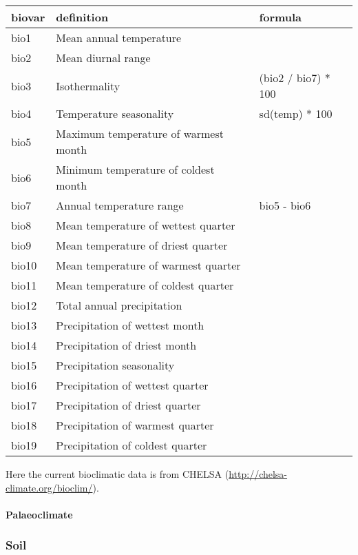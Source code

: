 \documentclass[]{article}
\let\oldparagraph\paragraph
\renewcommand{\paragraph}[1]{\oldparagraph{#1}\mbox{}}
\begin{document}
\captionsetup[table]{labelformat=empty,skip=1pt}
\begin{longtable}{lll}
\toprule
biovar & definition & formula \\ 
\midrule
bio1 & Mean annual temperature &  \\ 
bio2 & Mean diurnal range &  \\ 
bio3 & Isothermality & (bio2 / bio7) * 100 \\ 
bio4 & Temperature seasonality & sd(temp) * 100 \\ 
bio5 & Maximum temperature of warmest month &  \\ 
bio6 & Minimum temperature of coldest month &  \\ 
bio7 & Annual temperature range & bio5 - bio6 \\ 
bio8 & Mean temperature of wettest quarter &  \\ 
bio9 & Mean temperature of driest quarter &  \\ 
bio10 & Mean temperature of warmest quarter &  \\ 
bio11 & Mean temperature of coldest quarter &  \\ 
bio12 & Total annual precipitation &  \\ 
bio13 & Precipitation of wettest month &  \\ 
bio14 & Precipitation of driest month &  \\ 
bio15 & Precipitation seasonality &  \\ 
bio16 & Precipitation of wettest quarter &  \\ 
bio17 & Precipitation of driest quarter &  \\ 
bio18 & Precipitation of warmest quarter &  \\ 
bio19 & Precipitation of coldest quarter &  \\ 
\bottomrule
\end{longtable}

Here the current bioclimatic data is from CHELSA
(\url{http://chelsa-climate.org/bioclim/}).

\hypertarget{palaeoclimate}{%
\paragraph{Palaeoclimate}\label{palaeoclimate}}

\hypertarget{soil}{%
\subsubsection{Soil}\label{soil}}
\end{document}
